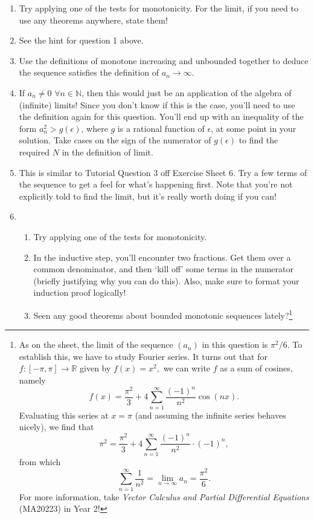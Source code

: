 \documentclass[
  17pt,
  a4paper]{extarticle}
\providecommand{\tightlist}{%
  \setlength{\itemsep}{0pt}\setlength{\parskip}{0pt}}
\theoremstyle{plain}
\theoremstyle{definition}
\theoremstyle{plain}
\theoremstyle{plain}
\theoremstyle{plain}
\theoremstyle{plain}
\theoremstyle{definition}
\theoremstyle{definition}
\theoremstyle{remark}
\theoremstyle{remark}
\renewcommand{\;}{\,}
\begin{document}
\begin{enumerate}
\def\labelenumi{\arabic{enumi}.}
\item
  Try applying one of the tests for monotonicity. For the limit, if you need to use any theorems anywhere, state them!
\item
  See the hint for question 1 above.
\item
  Use the definitions of monotone increasing and unbounded together to deduce the sequence satisfies the definition of \(a_n \to \infty\).
\item
  If \(a_n \neq 0 \, \; \forall n \in \mathbb{N}\), then this would just be an application of the algebra of (infinite) limits! Since you don't know if this is the case, you'll need to use the definition again for this question. You'll end up with an inequality of the form \(a_n^2 > g(\epsilon)\), where \(g\) is a rational function of \(\epsilon\), at some point in your solution. Take cases on the sign of the numerator of \(g(\epsilon)\) to find the required \(N\) in the definition of limit.
\item
  This is similar to Tutorial Question 3 off Exercise Sheet 6. Try a few terms of the sequence to get a feel for what's happening first. Note that you're not explicitly told to find the limit, but it's really worth doing if you can!
\item
  \begin{enumerate}
  \def\labelenumii{\alph{enumii})}
  \tightlist
  \item
    Try applying one of the tests for monotonicity.
  \item
    In the inductive step, you'll encounter two fractions. Get them over a common denominator, and then `kill off' some terms in the numerator (briefly justifying why you can do this). Also, make sure to format your induction proof logically!
  \item
    Seen any good theorems about bounded monotonic sequences lately?\footnote{As on the sheet, the limit of the sequence \((a_n)\) in this question is \(\pi^2/6.\) To establish this, we have to study Fourier series. It turns out that for \(f:[-\pi,\pi]\to\mathbb{R}\) given by \(f(x) = x^2,\) we can write \(f\) as a sum of cosines, namely \[f(x) = \frac{\pi^2}{3} + 4\sum_{n=1}^{\infty}\frac{(-1)^n}{n^2}\cos(nx).\] Evaluating this series at \(x=\pi\) (and assuming the infinite series behaves nicely), we find that \[\pi^2 = \frac{\pi^2}{3} + 4\sum_{n=1}^{\infty}\frac{(-1)^n}{n^2}\cdot(-1)^n,\] from which \[\sum_{n=1}^{\infty}\frac{1}{n^2} = \lim_{n\to \infty}a_n = \frac{\pi^2}{6}.\] For more information, take \emph{Vector Calculus and Partial Differential Equations} (MA20223) in Year 2!}
  \end{enumerate}
\end{enumerate}
\end{document}
